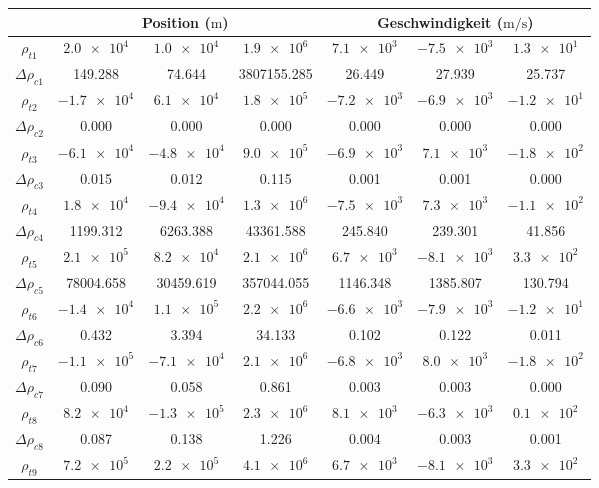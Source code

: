 \documentclass[a4paper,12pt]{article}
\numberwithin{equation}{section}
\begin{document}
\renewcommand{\arraystretch}{1.1}
\begin{longtable}{|c|c|c|c|c|c|c|}
\cline{2-7}
\multicolumn{1}{c|}{} & \multicolumn{3}{c|}{Position ($\si{\meter}$)} & \multicolumn{3}{c|}{Geschwindigkeit ($\si{\meter\per\second}$)} \\
\cline{2-7}\hline
$\rho_{t1}$ & $\num{2.0e4}$ & $\num{1.0e4}$ & $\num{1.9e6}$ & $\num{7.1e3} $ & $\num{-7.5e3}$ & $\num{1.3e1}$ \\
$\Delta \rho_{c1}$ & 149.288 & 74.644 & 3807155.285 & 26.449 & 27.939 & 25.737 \\
\hline
$\rho_{t2}$ & $\num{-1.7e4}$ & $\num{6.1e4}$ & $\num{1.8e5}$ & $\num{-7.2e3}$ & $\num{-6.9e3}$ & $\num{-1.2e1}$ \\
$\Delta \rho_{c2}$ & 0.000 & 0.000 & 0.000 & 0.000 & 0.000 & 0.000 \\
\hline
$\rho_{t3}$ & $\num{-6.1e4}$ & $\num{-4.8e4}$ & $\num{9.0e5}$ & $\num{-6.9e3}$ & $\num{7.1e3}$ & $\num{-1.8e2}$ \\
$\Delta \rho_{c3}$ & 0.015 & 0.012 & 0.115 & 0.001 & 0.001 & 0.000 \\
\hline
$\rho_{t4}$ & $\num{1.8e4}$ & $\num{-9.4e4}$ & $\num{1.3e6}$ & $\num{-7.5e3}$ & $\num{7.3e3}$ & $\num{-1.1e2}$ \\
$\Delta \rho_{c4}$ & 1199.312 & 6263.388 & 43361.588 & 245.840 & 239.301 & 41.856 \\
\hline
$\rho_{t5}$ & $\num{2.1e5}$ & $\num{8.2e4}$ & $\num{2.1e6}$ & $\num{6.7e3} $ & $\num{-8.1e3}$ & $\num{3.3e2}$ \\
$\Delta \rho_{c5}$ & 78004.658 & 30459.619 & 357044.055 & 1146.348 & 1385.807 & 130.794 \\
\hline
$\rho_{t6}$ & $\num{-1.4e4}$ & $\num{1.1e5}$ & $\num{2.2e6}$ & $\num{-6.6e3}$ & $\num{-7.9e3}$ & $\num{-1.2e1}$ \\
$\Delta \rho_{c6}$ & 0.432 & 3.394 & 34.133 & 0.102 & 0.122 & 0.011 \\
\hline
$\rho_{t7}$ & $\num{-1.1e5}$ & $\num{-7.1e4}$ & $\num{2.1e6}$ & $\num{-6.8e3}$ & $\num{8.0e3}$ & $\num{-1.8e2}$ \\
$\Delta \rho_{c7}$ & 0.090 & 0.058 & 0.861 & 0.003 & 0.003 & 0.000 \\
\hline
$\rho_{t8}$ & $\num{8.2e4}$ & $\num{-1.3e5}$ & $\num{2.3e6}$ & $\num{8.1e3}$ & $\num{-6.3e3}$ & $\num{0.1e2}$ \\
$\Delta \rho_{c8}$ & 0.087 & 0.138 & 1.226 & 0.004 & 0.003 & 0.001 \\
\hline
$\rho_{t9}$ & $\num{7.2e5}$ & $\num{2.2e5}$ & $\num{4.1e6}$ & $\num{6.7e3} $ & $\num{-8.1e3}$ & $\num{3.3e2}$ \\

\end{longtable}
\end{document}
